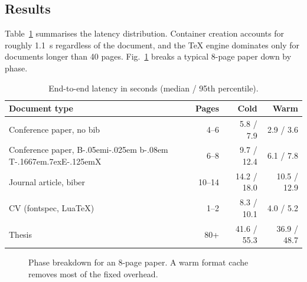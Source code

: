 \documentclass[conference]{IEEEtran}
\def\BibTeX{{\rm B\kern-.05em{\sc i\kern-.025em b}\kern-.08em
    T\kern-.1667em\lower.7ex\hbox{E}\kern-.125emX}}
\begin{document}
\subsection{Results}
Table~\ref{tab:latency} summarises the latency distribution. Container
creation accounts for roughly 1.1~s regardless of the document, and the
\TeX{} engine dominates only for documents longer than 40 pages.
Fig.~\ref{fig:latency} breaks a typical 8-page paper down by phase.

\begin{table}[t]
  \caption{End-to-end latency in seconds (median / 95th percentile).}
  \label{tab:latency}
  \centering
  \begin{tabular}{@{}lrrr@{}}
    \toprule
    Document type & Pages & Cold & Warm \\
    \midrule
    Conference paper, no bib & 4--6  & 5.8 / 7.9  & 2.9 / 3.6 \\
    Conference paper, \BibTeX & 6--8  & 9.7 / 12.4 & 6.1 / 7.8 \\
    Journal article, biber   & 10--14 & 14.2 / 18.0 & 10.5 / 12.9 \\
    CV (fontspec, Lua\TeX)   & 1--2  & 8.3 / 10.1 & 4.0 / 5.2 \\
    Thesis                   & 80+   & 41.6 / 55.3 & 36.9 / 48.7 \\
    \bottomrule
  \end{tabular}
\end{table}

\begin{figure}[t]
  \centering
  \caption{Phase breakdown for an 8-page paper. A warm format cache removes
    most of the fixed overhead.}
  \label{fig:latency}
\end{figure}
\end{document}
